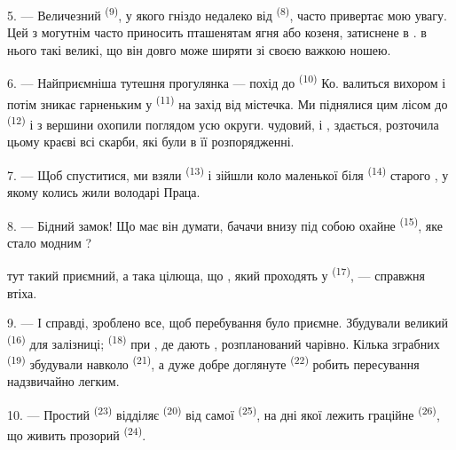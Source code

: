 5. --- Величезний  \textsuperscript{(9)}, у якого гніздо недалеко
від  \textsuperscript{(8)}, часто привертає мою увагу. Цей
 з могутнім  часто приносить пташенятам
ягня або козеня, затиснене в .  в нього такі
великі, що він довго може ширяти зі своєю важкою ношею.

\VUsaut{3.0mm}
\VUsaut{3.0mm}

6. --- Найприємніша тутешня прогулянка --- похід до 
\textsuperscript{(10)} Ко.  валиться вихором і потім зникає
гарненьким  у  \textsuperscript{(11)} на
захід від містечка. Ми піднялися цим лісом до 
\textsuperscript{(12)} і з вершини  охопили поглядом усю
 округи.  чудовий, і ,
здається, розточила цьому краєві всі скарби, які були в її розпорядженні.

7. --- Щоб спуститися, ми взяли  \textsuperscript{(13)} і
зійшли коло маленької  біля  \textsuperscript{(14)}
старого , у якому колись жили володарі Праца.

8. --- Бідний замок! Що має він думати, бачачи внизу під собою охайне
 \textsuperscript{(15)}, яке стало модним
?

 тут такий приємний, а  така цілюща, що
, який проходять у 
\textsuperscript{(17)}, --- справжня втіха.

\VUsaut{3.0mm}
\VUsaut{3.0mm}

9. --- І справді, зроблено все, щоб перебування було приємне. Збудували великий
 \textsuperscript{(16)} для залізниці; 
\textsuperscript{(18)} при , де дають ,
розпланований чарівно. Кілька зграбних  \textsuperscript{(19)}
збудували навколо  \textsuperscript{(21)}, а дуже добре доглянуте
 \textsuperscript{(22)} робить пересування надзвичайно легким.

10. --- Простий  \textsuperscript{(23)} відділяє 
\textsuperscript{(20)} від самої  \textsuperscript{(25)}, на дні
якої лежить граційне  \textsuperscript{(26)}, що живить прозорий
 \textsuperscript{(24)}.

